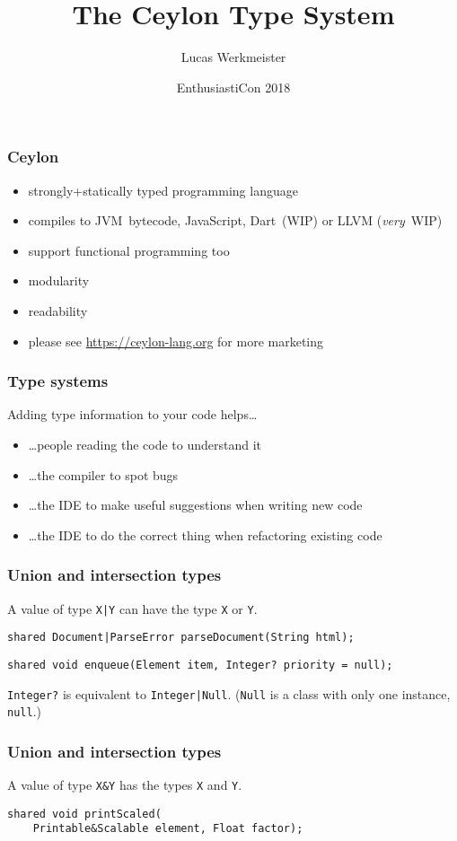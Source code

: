 \documentclass[aspectratio=169]{beamer}
\title{The Ceylon Type System}
\author{Lucas Werkmeister}
\date{EnthusiastiCon 2018}
\begin{document}
\frame{\titlepage}

\begin{frame}
  \frametitle{Ceylon}
  \begin{itemize}
  \item strongly+statically typed programming language
  \item compiles to JVM~bytecode, JavaScript, Dart~(WIP) or LLVM (\emph{very}~WIP)
  \item support functional programming too
  \item modularity
  \item readability
  \item please see \url{https://ceylon-lang.org} for more marketing
  \end{itemize}
\end{frame}

\begin{frame}
  \frametitle{Type systems}
  Adding type information to your code helps…
  \begin{itemize}
  \item …people reading the code to understand it
  \item …the compiler to spot bugs
  \item …the IDE to make useful suggestions when writing new code
  \item …the IDE to do the correct thing when refactoring existing code
  \end{itemize}
\end{frame}

\begin{frame}[fragile]
  \frametitle{Union and intersection types}
  A value of type \lstinline{X|Y} can have the type \lstinline{X} or \lstinline{Y}.
  \pause
  \begin{lstlisting}
shared Document|ParseError parseDocument(String html);
  \end{lstlisting}
  \pause
  \begin{lstlisting}
shared void enqueue(Element item, Integer? priority = null);
  \end{lstlisting}
  \pause
  \lstinline{Integer?} is equivalent to \lstinline{Integer|Null}.
  (\lstinline{Null} is a class with only one instance, \lstinline{null}.)
\end{frame}

\begin{frame}[fragile]
  \frametitle{Union and intersection types}
  A value of type \lstinline{X&Y} has the types \lstinline{X} and \lstinline{Y}.
  \pause
  \begin{lstlisting}
shared void printScaled(
    Printable&Scalable element, Float factor);
  \end{lstlisting}
\end{frame}
\end{document}
